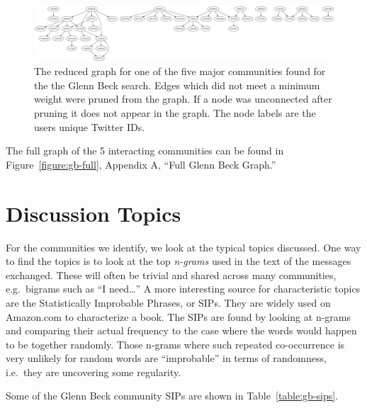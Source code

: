 \documentclass[10pt,oneside]{memoir}
\begin{document}
\begin{Spacing}{2}
\begin{figure}
\begin{center}
\includegraphics[width=6in]{figures/gb5-reduced}
\caption{The reduced graph for one of the five major communities found for the the Glenn Beck search.  Edges which did not meet a minimum weight were pruned from the graph.  If a node was unconnected after pruning it does not appear in the graph.  The node labels are the users unique Twitter IDs.}
\label{figure:gb-reduced}
\end{center}
\end{figure}
The full graph of the 5 interacting communities can be found in Figure~\ref{figure:gb-full}, Appendix A, ``Full Glenn Beck Graph.''


\pagebreak \section{Discussion Topics}
\label{discussiontopics}

For the communities we identify, we look at the typical topics discussed. One way to find the topics is to look at the top {\itshape n-grams} \cite{Ngram:Chen-Goodman} used in the text of the messages exchanged. These will often be trivial and shared across many communities, e.g.\ bigrams such as ``I need{\ldots}'' A more interesting source for characteristic topics are the Statistically Improbable Phrases, or SIPs. They are widely used on Amazon.com to characterize a book. The SIPs are found by looking at n-grams and comparing their actual frequency to the case where the words would happen to be together randomly. Those n-grams where such repeated co-occurrence is very unlikely for random words are ``improbable'' in terms of randomness, i.e.\ they are uncovering some regularity.


Some of the Glenn Beck community SIPs are shown in Table~\ref{table:gb-sips}.




\end{Spacing}
\end{document}
